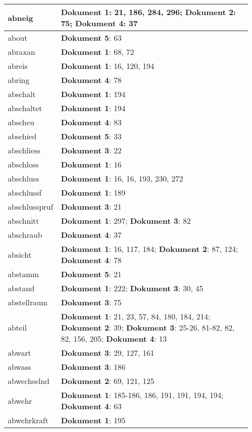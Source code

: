 \documentclass[a5paper]{article}
\begin{document}
\begin{longtable}[l]{|l|p{3in}|}
\hline
abneig & \textbf{Dokument 1}: 21, 186, 284, 296; \textbf{Dokument 2}: 75; \textbf{Dokument 4}: 37 \\
\hline
about & \textbf{Dokument 5}: 63 \\
\hline
abraxan & \textbf{Dokument 1}: 68, 72 \\
\hline
abreis & \textbf{Dokument 1}: 16, 120, 194 \\
\hline
abring & \textbf{Dokument 4}: 78 \\
\hline
abschalt & \textbf{Dokument 1}: 194 \\
\hline
abschaltet & \textbf{Dokument 1}: 194 \\
\hline
abscheu & \textbf{Dokument 4}: 83 \\
\hline
abschied & \textbf{Dokument 5}: 33 \\
\hline
abschliess & \textbf{Dokument 3}: 22 \\
\hline
abschloss & \textbf{Dokument 1}: 16 \\
\hline
abschluss & \textbf{Dokument 1}: 16, 16, 193, 230, 272 \\
\hline
abschlussf & \textbf{Dokument 1}: 189 \\
\hline
abschlusspruf & \textbf{Dokument 3}: 21 \\
\hline
abschnitt & \textbf{Dokument 1}: 297; \textbf{Dokument 3}: 82 \\
\hline
abschraub & \textbf{Dokument 4}: 37 \\
\hline
absicht & \textbf{Dokument 1}: 16, 117, 184; \textbf{Dokument 2}: 87, 124; \textbf{Dokument 4}: 78 \\
\hline
abstamm & \textbf{Dokument 5}: 21 \\
\hline
abstand & \textbf{Dokument 1}: 222; \textbf{Dokument 3}: 30, 45 \\
\hline
abstellraum & \textbf{Dokument 3}: 75 \\
\hline
abteil & \textbf{Dokument 1}: 21, 23, 57, 84, 180, 184, 214; \textbf{Dokument 2}: 39; \textbf{Dokument 3}: 25-26, 81-82, 82, 82, 156, 205; \textbf{Dokument 4}: 13 \\
\hline
abwart & \textbf{Dokument 3}: 29, 127, 161 \\
\hline
abwass & \textbf{Dokument 3}: 186 \\
\hline
abwechselnd & \textbf{Dokument 2}: 69, 121, 125 \\
\hline
abwehr & \textbf{Dokument 1}: 185-186, 186, 191, 191, 194, 194; \textbf{Dokument 4}: 63 \\
\hline
abwehrkraft & \textbf{Dokument 1}: 195 \\

\end{longtable}
\end{document}

